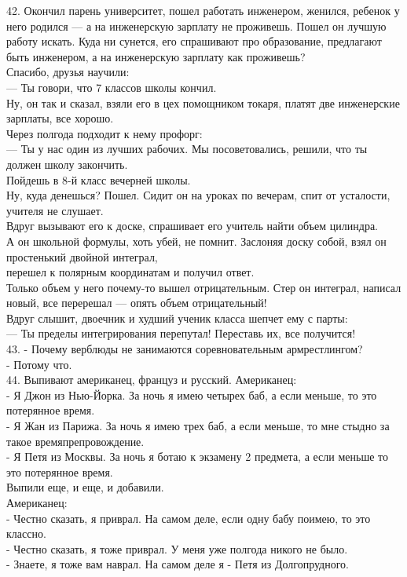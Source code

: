 \documentclass[a4paper,20pt,notitlepage]{extbook}
\begin{document}
	42. Окончил парень университет, пошел работать инженером, женился, ребенок у него родился — а на инженерскую зарплату не проживешь. Пошел он лучшую работу искать. Куда ни сунется, его спрашивают про образование, предлагают быть инженером,
	 а на инженерскую зарплату как проживешь? \\
	 Спасибо, друзья научили:\\
	— Ты говори, что 7 классов школы кончил.\\
	Ну, он так и сказал, взяли его в цех помощником токаря, платят две инженерские зарплаты, все хорошо.\\
	 Через полгода подходит к нему профорг:\\
	— Ты у нас один из лучших рабочих. Мы посоветовались, решили, что ты должен школу закончить. \\
	Пойдешь в 8-й класс вечерней школы.\\
	Ну, куда денешься? Пошел. Сидит он на уроках по вечерам, спит от усталости, учителя не слушает.\\
	 Вдруг вызывают его к доске, спрашивает его учитель найти объем цилиндра.\\
	  А он школьной формулы, хоть убей, не помнит. Заслоняя доску собой, взял он простенький двойной интеграл, \\
	  перешел к полярным координатам и получил ответ. \\
	  Только объем у него почему-то вышел отрицательным. Стер он интеграл, написал новый, все перерешал — опять объем отрицательный!\\ 
	  Вдруг слышит, двоечник и худший ученик класса шепчет ему с парты:\\
	— Ты пределы интегрирования перепутал! Переставь их, все получится!\\
	
	43. - Почему верблюды не занимаются соревновательным армрестлингом? \\
	- Потому что.\\
	
	44. Выпивают американец, француз и русский. Американец:\\
	- Я Джон из Нью-Йорка. За ночь я имею четырех баб, а если меньше, то это потерянное время.\\
	- Я Жан из Парижа. За ночь я имею трех баб, а если меньше, то мне стыдно за такое времяпрепровождение.\\
	- Я Петя из Москвы. За ночь я ботаю к экзамену 2 предмета, а если меньше то это потерянное время.\\
	Выпили еще, и еще, и добавили.\\
	Американец:\\
	- Честно сказать, я приврал. На самом деле, если одну бабу поимею, то это классно.\\
	- Честно сказать, я тоже приврал. У меня уже полгода никого не было.\\
	- Знаете, я тоже вам наврал. На самом деле я - Петя из Долгопрудного.\\
	
\end{document}
